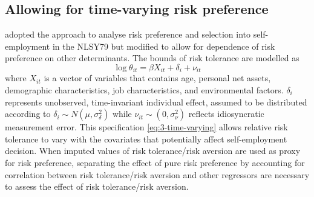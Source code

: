 \documentclass[]{article}
\begin{document}
\subsection{Allowing for time-varying risk preference}	
\citet{ahn2010attitudes} adopted the approach to analyse risk preference and selection into self-employment in the NLSY79 but modified to allow for dependence of risk preference on other determinants. The bounds of risk tolerance are modelled as
 	\begin{equation}
 		\log \theta_{it}=\beta X_{it} + \delta_i+\nu_{it}
 		\label{eq:3-time-varying}
 	\end{equation}
where $X_{it}$ is a vector of variables that contains age, personal net assets, demographic characteristics, job characteristics, and environmental factors. $\delta_i$ represents unobserved, time-invariant individual effect, assumed to be distributed according to $\delta_i\sim N(\mu, \sigma^2_\delta)$ while $\nu_{it}\sim (0,\sigma^2_\nu)$ reflects idiosyncratic measurement error. This specification \eqref{eq:3-time-varying} allows relative risk tolerance to vary with the covariates that potentially affect self-employment decision. When imputed values of risk tolerance/risk aversion are used as proxy for risk preference, separating the effect of pure risk preference by accounting for correlation between risk tolerance/risk aversion and other regressors are necessary to assess the effect of risk tolerance/risk aversion. 
	
	
	
	
	

	
\pagebreak

	
\end{document}

